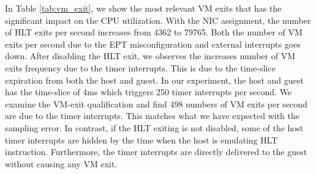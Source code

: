 In Table \ref{tab:vm_exit}, we show the most relevant VM exits
that has the significant impact on the CPU utilization. With
the NIC assignment, the number of HLT exits per second
increases from 4362 to 79765. Both the number of VM exits per
second due to the EPT misconfiguration and external interrupts
goes down. After disabling the HLT exit, we observes the
increases number of VM exits frequency due to the timer
interrupts. This is due to the time-slice expiration from both
the host and guest. In our experiment, the host and guest has
the time-slice of 4ms which triggers 250 timer interrupts per
second. We examine the VM-exit qualification and find 498
numbers of VM exits per second are due to the timer
interrupts. This matches what we have expected with the
sampling error. In contrast, if the HLT exiting is not
disabled, some of the host timer interrupts are hidden by the
time when the host is emulating HLT instruction. Furthermore,
the timer interrupts are directly delivered to the guest
without causing any VM exit.
